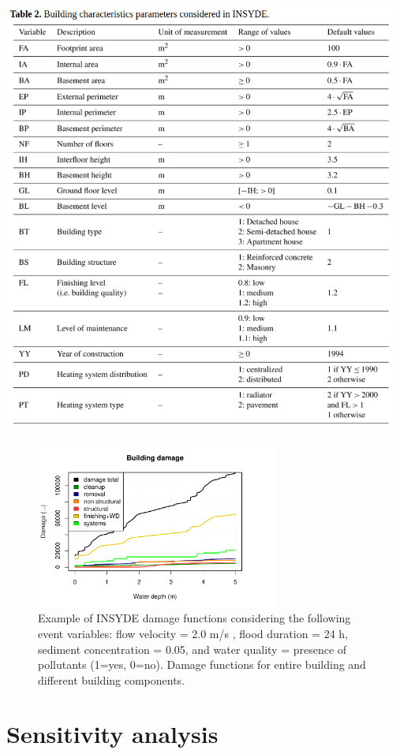 \documentclass[gc, manuscript]{copernicus}
\begin{document}
\includegraphics[width=13cm]{table2}

\begin{figure}
\includegraphics[width=300px]{Insyde_files/figure-latex/clam_setup-1} \caption{Example of INSYDE damage functions considering the following event variables: flow velocity = 2.0 m/s , flood duration = 24 h, sediment concentration = 0.05, and water quality = presence of pollutants (1=yes, 0=no). Damage functions for entire building and different building components.}\label{fig:clam_setup}
\end{figure}

\section{Sensitivity analysis}
\end{document}
